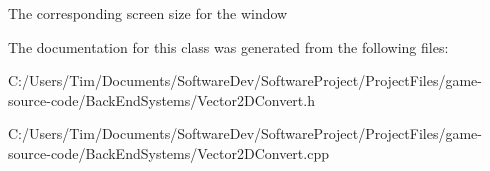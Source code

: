 The corresponding screen size for the window 

The documentation for this class was generated from the following files\+:\begin{DoxyCompactItemize}
\item 
C\+:/\+Users/\+Tim/\+Documents/\+Software\+Dev/\+Software\+Project/\+Project\+Files/game-\/source-\/code/\+Back\+End\+Systems/Vector2\+D\+Convert.\+h\item 
C\+:/\+Users/\+Tim/\+Documents/\+Software\+Dev/\+Software\+Project/\+Project\+Files/game-\/source-\/code/\+Back\+End\+Systems/Vector2\+D\+Convert.\+cpp\end{DoxyCompactItemize}
